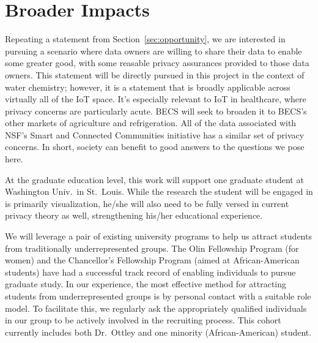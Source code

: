 \section{Broader Impacts}
\label{sec:broader}

Repeating a statement from Section~\ref{sec:opportunity},
we are interested in pursuing a scenario
where data owners are willing to share their data to enable some greater
good, with some reasable privacy assurances provided to those data owners.
This statement will be directly pursued in this project in the context of water
chemistry; however, it is a statement that is broadly applicable
across virtually all of the IoT space.
It's especially relevant to IoT in healthcare, where privacy concerns
are particularly acute.
BECS will seek to broaden it to BECS's other markets of agriculture
and refrigeration.
All of the data associated with NSF's Smart and Connected Communities
initiative has a similar set of privacy concerns.
In short, society can benefit to good answers to the questions we pose here.

At the graduate education level, this work will support one graduate
student at Washington Univ.~in St.~Louis.
While the research the student will be engaged in is primarily
visualization, he/she will also need to be fully versed in current
privacy theory as well, strengthening his/her educational experience.

We will leverage a pair of existing university programs to help us
attract students from traditionally underrepresented groups.  The Olin
Fellowship Program (for women) and the Chancellor's Fellowship Program
(aimed at African-American students) have had a successful track
record of enabling individuals to pursue graduate study.  In our
experience, the most effective method for attracting students from
underrepresented groups is by personal contact with a suitable role
model.  To facilitate this, we regularly ask the appropriately
qualified individuals in our group to be actively involved in the
recruiting process.  This cohort currently includes both Dr.~Ottley
and one minority (African-American) student.
